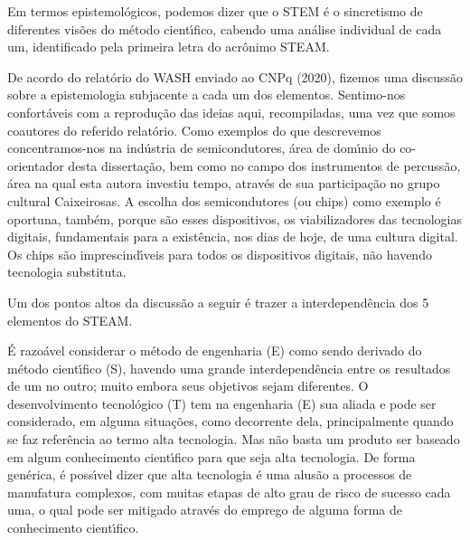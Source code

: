 \documentclass[
12pt,		%
openright,	%
twoside,  %
a4paper,			%
chapter=TITLE,		%
english,			%
french,				%
spanish,			%
brazil				%
]{USPSC-classe/USPSC}
\begin{document}
Em termos epistemol\'ogicos, podemos dizer que o STEM \'e o sincretismo de diferentes vis\~oes do m\'etodo cient\'{\i}fico, cabendo uma an\'alise individual de cada um, identificado pela primeira letra do acr\^onimo STEAM.









De acordo do relat\'orio do WASH enviado ao CNPq (2020), fizemos uma discuss\~ao sobre a epistemologia subjacente a cada um dos elementos. Sentimo-nos confort\'aveis com a reprodu\c{c}\~ao das ideias aqui, recompiladas, uma vez que somos coautores do referido relat\'orio. Como exemplos do que descrevemos concentramos-nos na ind\'ustria de semicondutores, \'area de dom\'{\i}nio do co-orientador desta disserta\c{c}\~ao, bem como no campo dos instrumentos de percuss\~ao, \'area na qual esta autora investiu tempo, atrav\'es de sua participa\c{c}\~ao no grupo cultural \textquotedbl Caixeirosas\textquotedbl . A escolha dos semicondutores (ou chips) como exemplo \'e oportuna, tamb\'em, porque s\~ao esses dispositivos, os viabilizadores das tecnologias digitais, fundamentais para a exist\^encia, nos dias de hoje, de uma \textquotedbl cultura digital\textquotedbl . Os chips s\~ao imprescind\'{\i}veis para todos os dispositivos digitais, n\~ao havendo tecnologia substituta.









Um dos pontos altos da discuss\~ao a seguir \'e trazer a interdepend\^encia dos 5 elementos do STEAM.









\'E razo\'avel considerar o m\'etodo de engenharia (E) como sendo derivado do m\'etodo cient\'{\i}fico (S), havendo uma grande interdepend\^encia entre os resultados de um no outro; muito embora seus objetivos sejam diferentes. O desenvolvimento tecnol\'ogico (T) tem na engenharia (E) sua aliada e pode ser considerado, em alguma situa\c{c}\~oes, como decorrente dela, principalmente quando se faz refer\^encia ao termo \textquotedbl alta tecnologia\textquotedbl . Mas n\~ao basta um produto ser baseado em algum conhecimento cient\'{\i}fico para que seja alta tecnologia. De forma gen\'erica, \'e poss\'{\i}vel dizer que \textquotedbl alta tecnologia \textquotedbl  \'e uma alus\~ao a processos de manufatura complexos, com muitas etapas de alto grau de risco de sucesso cada uma, o qual pode ser mitigado atrav\'es do emprego de alguma forma de conhecimento cient\'{\i}fico.
\end{document}
